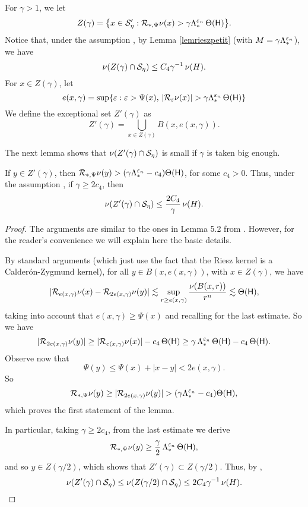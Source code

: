 For $\gamma>1$, we let
$$Z(\gamma) = \big\{x\in {\mathcal S}_\eta': {\mathcal R}_{*,\Psi}\nu(x) > \gamma \Lambda_*^{{\varepsilon}_n}\,\Theta({\mathsf{H}})\big\}.$$
Notice that, under the assumption  , by Lemma \ref{lemrieszpetit}
 (with $M= \gamma \Lambda_*^{{\varepsilon}_n}$), we have
\begin{equation}\label{eqzgam1}
\nu(Z(\gamma)\cap {\mathcal S}_\eta) \leq C_4\gamma^{-1}\,\nu(H).
\end{equation}
For $x\in Z(\gamma)$, let
\begin{equation}\label{eqe3194}
e(x,\gamma) = \sup\{\ve: \ve>\Psi(x),\,|\RR_\ve\nu(x)|>\gamma \Lambda_*^{\ve_n}\,\Theta(\sH)\}
\end{equation}
We define the exceptional set $Z'(\gamma)$ as
$$Z'(\gamma) = \bigcup_{x\in Z(\gamma)} B(x,e(x,\gamma)).$$

The next lemma shows that $\nu(Z'(\gamma)\cap {\mathcal S}_\eta)$ is small if $\gamma$ is taken big enough.

\vv
\begin{lemma} \label{tamt}
If $y\in Z'(\gamma)$, then ${\mathcal R}_{*,\Psi}\nu(y) > (\gamma \Lambda_*^{{\varepsilon}_n}- c_4)\Theta({\mathsf{H}})$,
for some $c_4>0$.
Thus, under the assumption  ,
if $\gamma\geq 2c_4$, then
\begin{equation} \label{wert1}
\nu(Z'(\gamma)\cap {\mathcal S}_\eta) \leq \frac{2C_4}{\gamma}\,\nu(H).
\end{equation}
\end{lemma}

\begin{proof}
The arguments are similar to the ones in Lemma 5.2 from
\cite{Tolsa-llibre}. However, for the reader's convenience we will explain here the basic details.

By standard arguments (which just use the fact that the Riesz kernel is a Calder\'on-Zygmund kernel),
for all $y\in B(x,e(x,\gamma))$, with $x\in Z(\gamma)$,
 we have
$$|{\mathcal R}_{e(x,\gamma)}\nu(x) -{\mathcal R}_{2e(x,\gamma)}\nu(y)|\lesssim \sup_{r\geq e(x,\gamma)} \frac{\nu(B(x,r))}{r^n} \lesssim \Theta({\mathsf{H}}),$$
taking into account that $e(x,\gamma)\geq\Psi(x)$ and recalling  for the last estimate.
So we have
$$|{\mathcal R}_{2e(x,\gamma)}\nu(y)| \geq |{\mathcal R}_{e(x,\gamma)}\nu(x)|- c_4\,\Theta({\mathsf{H}}) \geq  \gamma\,\Lambda_*^{{\varepsilon}_n}\,\Theta({\mathsf{H}}) -  c_4\,\Theta({\mathsf{H}}).$$
Observe now that
$$\Psi(y)\leq \Psi(x) + |x-y|< 2e(x,\gamma).$$ 
So 
$$\RR_{*,\Psi}\nu(y) \geq |\RR_{2e(x,\gamma)}\nu(y)|> (\gamma \Lambda_*^{\ve_n}- c_4)\Theta(\sH),$$
which proves the first statement of the lemma.

In particular, taking $\gamma\geq 2c_4$, from the last estimate we derive 
$${\mathcal R}_{*,\Psi}\nu(y) \geq \frac\gamma2\,\Lambda_*^{{\varepsilon}_n}\,\Theta({\mathsf{H}}),$$
and so $y\in Z(\gamma/2)$, which shows that $Z'(\gamma)\subset Z(\gamma/2)$. Thus,
by ,
$$\nu(Z'(\gamma)\cap {\mathcal S}_\eta) \leq \nu(Z(\gamma/2)\cap {\mathcal S}_\eta) 
\leq 2C_4\gamma^{-1}\,\nu(H).$$
\end{proof}
\vv

